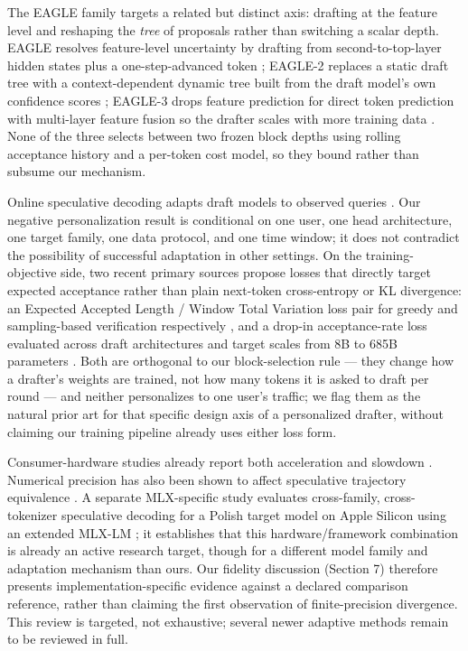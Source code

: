 \documentclass[
  11pt,
]{article}
\begin{document}
The EAGLE family targets a related but distinct axis: drafting at the
feature level and reshaping the \emph{tree} of proposals rather than
switching a scalar depth. EAGLE resolves feature-level uncertainty by
drafting from second-to-top-layer hidden states plus a one-step-advanced
token \citep{li2024eagle}; EAGLE-2 replaces a static draft tree with a
context-dependent dynamic tree built from the draft model's own
confidence scores \citep{li2024eagle2}; EAGLE-3 drops feature prediction
for direct token prediction with multi-layer feature fusion so the
drafter scales with more training data \citep{li2025eagle3}. None of the
three selects between two frozen block depths using rolling acceptance
history and a per-token cost model, so they bound rather than subsume
our mechanism.

Online speculative decoding adapts draft models to observed queries
\citep{liu2024}. Our negative personalization result is conditional on
one user, one head architecture, one target family, one data protocol,
and one time window; it does not contradict the possibility of
successful adaptation in other settings. On the training-objective side,
two recent primary sources propose losses that directly target expected
acceptance rather than plain next-token cross-entropy or KL divergence:
an Expected Accepted Length / Window Total Variation loss pair for
greedy and sampling-based verification respectively
\citep{xia2026acceptanceaware}, and a drop-in acceptance-rate loss
evaluated across draft architectures and target scales from 8B to 685B
parameters \citep{samarin2026lkloss}. Both are orthogonal to our
block-selection rule --- they change how a drafter's weights are
trained, not how many tokens it is asked to draft per round --- and
neither personalizes to one user's traffic; we flag them as the natural
prior art for that specific design axis of a personalized drafter,
without claiming our training pipeline already uses either loss form.

Consumer-hardware studies already report both acceleration and slowdown
\citep{chordiya2026}. Numerical precision has also been shown to affect
speculative trajectory equivalence \citep{koziev2026}. A separate
MLX-specific study evaluates cross-family, cross-tokenizer speculative
decoding for a Polish target model on Apple Silicon using an extended
MLX-LM \citep{fonal2026mlx}; it establishes that this hardware/framework
combination is already an active research target, though for a different
model family and adaptation mechanism than ours. Our fidelity discussion
(Section 7) therefore presents implementation-specific evidence against
a declared comparison reference, rather than claiming the first
observation of finite-precision divergence. This review is targeted, not
exhaustive; several newer adaptive methods remain to be reviewed in
full.
\end{document}
